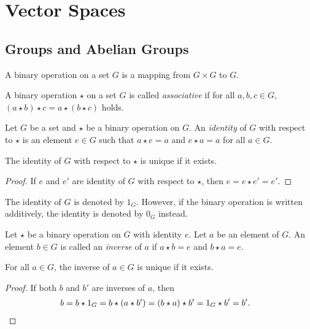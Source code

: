 \chapter{Vector Spaces}
\section{Groups and Abelian Groups}
\begin{definition}\label{def:binary-operation}
  A binary operation on a set $G$ is a mapping from $G \times G$ to $G$.
\end{definition}

\begin{definition}\label{def:associativity}
  A binary operation $\star$ on a set $G$ is called \emph{associative} if
  for all $a, b, c \in G$, $(a \star b) \star c = a \star (b \star c)$ holds.
\end{definition}

\begin{definition}\label{def:identity}
  Let $G$ be a set and $\star$ be a binary operation on $G$. An
  \emph{identity} of $G$ with respect to $\star$ is an element $e \in G$ such
  that $a \star e = a$ and $e \star a = a$ for all $a \in G$.
\end{definition}

\begin{theorem}\label{thm:identity-uniqueness}
  The identity of $G$ with respect to $\star$ is unique if it exists.
\end{theorem}
\begin{proof}
  If $e$ and $e'$ are identity of $G$ with respect to $\star$, then
  $e = e \star e' = e'$.
\end{proof}

\begin{notation}
  The identity of $G$ is denoted by $1_G$.
  However, if the binary operation is written additively, the identity is
  denoted by $0_G$ instead.
\end{notation}

\begin{definition}\label{def:inverse}
  Let $\star$ be a binary operation on $G$ with identity $e$. Let $a$ be an
  element of $G$. An element $b \in G$ is called an \emph{inverse} of $a$ if
  $a \star b = e$ and $b \star a = e$.
\end{definition}

\begin{theorem}\label{thm:inverse-uniqueness}
  For all $a \in G$, the inverse of $a \in G$ is unique if it exists.
\end{theorem}
\begin{proof}
  If both $b$ and $b'$ are inverses of $a$, then
  \begin{align*}
  b
  = b \star 1_G
  = b \star (a \star b')
  = (b \star a) \star b'
  = 1_G \star b'
  = b'. &\qedhere
  \end{align*}
\end{proof}

